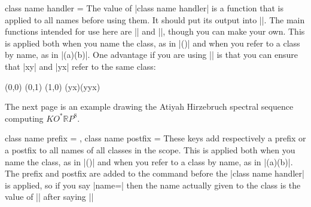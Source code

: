 \begin{sseqdata}[name = basic, cohomological Serre grading]
\begin{key}{class name handler = }
The value of |class name handler| is a function that is applied to all names before using them. It should put its output into |\result|.
The main functions intended for use here are |\SseqAHSSNameHandler| and |\SseqNormalizeMonomial|, though you can make your own. This is applied both when you name the class, as in \codeverb|\class[name=a]()| and when you refer to a class by name, as in |\structline(a)(b)|. One advantage if you are using |\SseqNormalizeMonomial| is that you can ensure that |xy| and |yx| refer to the same class:
\begin{codeexample}[]
\begin{sseqpage}[ class name handler = \SseqNormalizeMonomial,
                  classes = {show name = {right,pin}} ]
\class[name=xy](0,0)
\class[name=yxy](0,1)
\class(1,0)
\structline(yx)(yyx)
\end{sseqpage}
\end{codeexample}
The next page is an example drawing the Atiyah Hirzebruch spectral sequence computing $KO^*\mathbb{R}P^{8}$.
\end{key}

\begin{keylist}{class name prefix = , class name postfix = }
These keys add respectively a prefix or a postfix to all names of all classes in the scope. This is applied both when you name the class, as in \codeverb|\class[name=a]()| and when you refer to a class by name, as in |\structline(a)(b)|.
The prefix and postfix are added to the command before the |class name handler| is applied, so if you say |name=| then the name actually given to the class is the value of |\result| after saying ||
\end{keylist}


\end{sseqdata}
